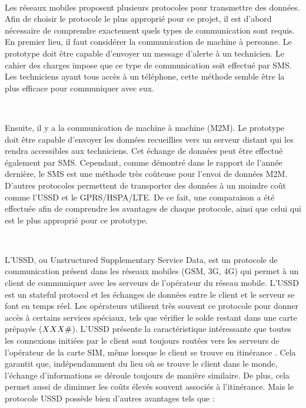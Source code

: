 ~

\noindent
Les réseaux mobiles proposent plusieurs protocoles pour transmettre des données. Afin de choisir le protocole le plus approprié pour ce projet, il est d'abord nécessaire de comprendre exactement quels types de communication sont requis. En premier lieu, il faut considérer la communication de machine à personne. Le prototype doit être capable d'envoyer un message d'alerte à un technicien. Le cahier des charges impose que ce type de communication soit effectué par SMS. Les techniciens ayant tous accès à un téléphone, cette méthode semble être la plus efficace pour communiquer avec eux.

~

\noindent
Ensuite, il y a la communication de machine à machine (M2M). Le prototype doit être capable d'envoyer les données recueillies vers un serveur distant qui les rendra accessibles aux techniciens. Cet échange de données peut être effectué également par SMS. Cependant, comme démontré dans le rapport de l'année dernière, le SMS est une méthode très coûteuse pour l'envoi de données M2M. D'autres protocoles permettent de transporter des données à un moindre coût comme l'USSD et le GPRS/HSPA/LTE. De ce fait, une comparaison a été effectuée afin de comprendre les avantages de chaque protocole, ainsi que celui qui est le plus approprié pour ce prototype.


~

\noindent
L'USSD, ou Unstructured Supplementary Service Data, est un protocole de communication présent dans les réseaux mobiles (GSM, 3G, 4G) qui permet à un client de communiquer avec les serveurs de l'opérateur du réseau mobile. L'USSD est un stateful protocol et les échanges de données entre le client et le serveur se font en temps réel.  Les opérateurs utilisent très souvent ce protocole pour donner accès à certains services spéciaux, tels que vérifier le solde restant dans une carte prépayée ($\*XXX\#$). L'USSD présente la caractéristique intéressante que toutes les connexions initiées par le client sont toujours routées vers les serveurs de l'opérateur de la carte SIM, même lorsque le client se trouve en itinérance \cite{lakshmi2017ussd}. Cela garantit que, indépendamment du lieu où se trouve le client dans le monde, l'échange d'informations se déroule toujours de manière similaire. De plus, cela permet aussi de diminuer les coûts élevés souvent associés à l'itinérance. Mais le protocole USSD possède bien d'autres avantages tels que :

~

